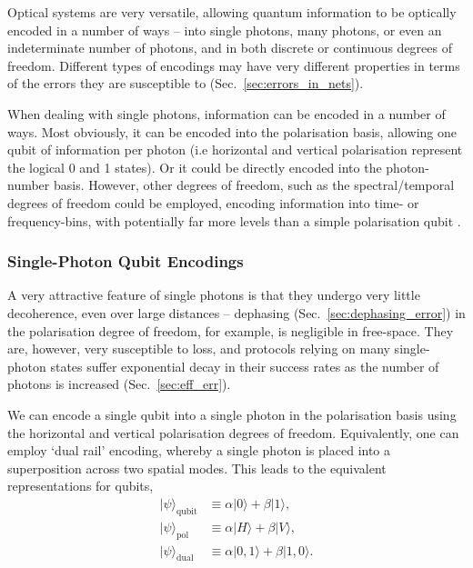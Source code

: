 \documentclass[aps,rmp,twocolumn,amsmath,amssymb,nofootinbib,superscriptaddress]{revtex4}
\newcommand{\ket}[1]{|#1\rangle}
\begin{document}
Optical systems are very versatile, allowing quantum information to be optically encoded in a number of ways -- into single photons, many photons, or even an indeterminate number of photons, and in both discrete or continuous degrees of freedom. Different types of encodings may have very different properties in terms of the errors they are susceptible to (Sec.~\ref{sec:errors_in_nets}).

When dealing with single photons, information can be encoded in a number of ways. Most obviously, it can be encoded into the polarisation basis, allowing one qubit of information per photon (i.e horizontal and vertical polarisation represent the logical 0 and 1 states). Or it could be directly encoded into the photon-number basis. However, other degrees of freedom, such as the spectral/temporal degrees of freedom could be employed, encoding information into time- or frequency-bins, with potentially far more levels than a simple polarisation qubit \cite{bib:RohdeInfCap13}.

%
%

\subsubsection{Single-Photon Qubit Encodings}

A very attractive feature of single photons is that they undergo very little decoherence, even over large distances -- dephasing (Sec.~\ref{sec:dephasing_error}) in the polarisation degree of freedom, for example, is negligible in free-space. They are, however, very susceptible to loss, and protocols relying on many single-photon states suffer exponential decay in their success rates as the number of photons is increased (Sec.~\ref{sec:eff_err}).

We can encode a single qubit into a single photon in the polarisation basis using the horizontal and vertical polarisation degrees of freedom. Equivalently, one can employ `dual rail' encoding, whereby a single photon is placed into a superposition across two spatial modes. This leads to the equivalent representations for qubits,
\begin{align} \label{eq:single_photon_enc}
\ket{\psi}_\mathrm{qubit} &\equiv \alpha\ket{0} + \beta\ket{1}, \nonumber \\
\ket{\psi}_\mathrm{pol} &\equiv \alpha\ket{H} + \beta\ket{V}, \nonumber \\
\ket{\psi}_\mathrm{dual} &\equiv \alpha\ket{0,1} + \beta\ket{1,0}.
\end{align}
\end{document}
